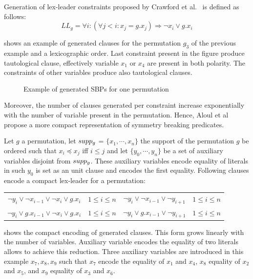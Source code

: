Generation of lex-leader constraints proposed by Crawford et al.~\cite{crawford1996symmetry} is defined as follows:
$$ LL_g = \forall i : (\forall j < i : x_j = g.x_j) \Rightarrow  \neg x_i \lor g.x_i$$
 
  shows an example of generated clauses for the  permutation $g_3$ of the previous 
 example and a lexicographic order. Last constraint present in the figure produce tautological clause,
 effectively variable $x_1$ or $x_4$ are present in both polarity. The constraints of other variables produce 
 also tautological clauses. 
 
 
 \begin{figure}[!htbp]
  
  \caption{Example of generated SBPs for one permutation}
  \label{fig:esbp_gen}
 \end{figure}
 
 
 Moreover, the number of clauses generated per constraint increase exponentially with the number of variable present in the permutation.
  Hence, Aloul et al~\cite{aloul06} propose a more compact representation of  symmetry breaking predicates.
 
 Let $g$ a permutation, let $supp_g$ = $\{x_1, \cdots, x_n\}$ the support of the permutation $g$ be ordered 
 such that $x_i \preceq x_j$ iff $i \leq j$  and let $\{y_0,\cdots, y_{n} \}$ be a set of auxiliary variables
 disjoint from $supp_g$. These auxiliary variables encode equality of literals in such $y_0$ is set as an unit clause
 and encodes the first equality.
 Following clauses encode a compact lex-leader for a permutation:
 
\begin{center}
\begin{tabular}{cc|cc}
 $\neg y_i \lor \neg x_{i-1} \lor \neg x_i \lor g.x_i$ & $1 \leq i \leq n$ & $ \neg y_i \lor \neg x_{i-1} \lor \neg y_{i+1}$ & $1 \leq i \leq n$ \\
 $\neg y_i \lor  g.x_{i-1} \lor \neg x_i \lor g.x_i$ & $1 \leq i \leq n$ & $ \neg y_i \lor g.x_{i-1} \lor \neg y_{i+1}$ & $1 \leq i \leq n$ \\
 
\end{tabular}
\end{center}

 shows the compact encoding of generated clauses. This form grows linearly with the number of variables.
Auxiliary variable encodes the equality of two literals allows to achieve this reduction. Three auxiliary variables are introduced
in this example $x_7, x_8, x_9$ such that $x_7$ encode the equality of $x_1$ and $x_4$, $x_8$ equality of $x_2$ and $x_5$, and $x_9$ equality of $x_3$ and $x_6$.

